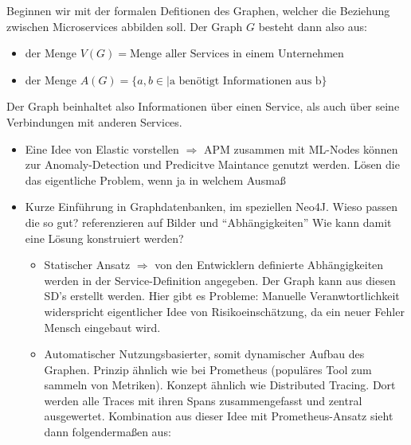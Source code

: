 \documentclass[
	12pt,
	BCOR=5mm,
	DIV=12,
	headinclude=on,
	footinclude=off,
	parskip=half,
	bibliography=totoc,
	listof=entryprefix,
	toc=listof,
	numbers=noenddot,
	plainfootsepline
]{scrreprt}
\begin{document}
\begin{example}
	Beginnen wir mit der formalen Defitionen des Graphen, welcher die Beziehung zwischen Microservices abbilden soll. Der Graph $G$ besteht dann also aus: 
	\begin{itemize}
		\item der Menge $V(G)=\text{Menge aller Services in einem Unternehmen}$
		\item der Menge $A(G)=\{a,b \in \mid \text{a benötigt Informationen aus b}\}$
	\end{itemize}
	Der Graph beinhaltet also Informationen über einen Service, als auch über seine Verbindungen mit anderen Services.
\end{example}


\begin{itemize}
	\item Eine Idee von Elastic vorstellen $\Rightarrow$ APM zusammen mit ML-Nodes können zur Anomaly-Detection und Predicitve Maintance genutzt werden. Lösen die das eigentliche Problem, wenn ja in welchem Ausmaß
	\item Kurze Einführung in Graphdatenbanken, im speziellen Neo4J. Wieso passen die so gut? referenzieren auf Bilder und \enquote{Abhängigkeiten} Wie kann damit eine Lösung konstruiert werden?
	\begin{itemize}
		\item Statischer Ansatz $\Rightarrow$ von den Entwicklern definierte Abhängigkeiten werden in der Service-Definition angegeben. Der Graph kann aus diesen SD's erstellt werden. Hier gibt es Probleme: Manuelle Veranwtortlichkeit widerspricht eigentlicher Idee von Risikoeinschätzung, da ein neuer Fehler Mensch eingebaut wird.
		\item Automatischer Nutzungsbasierter, somit dynamischer Aufbau des Graphen. Prinzip ähnlich wie bei Prometheus (populäres Tool zum sammeln von Metriken). Konzept ähnlich wie Distributed Tracing. Dort werden alle Traces mit ihren Spans zusammengefasst und zentral ausgewertet. Kombination aus dieser Idee mit Prometheus-Ansatz sieht dann folgendermaßen aus:
		

\end{itemize}
\end{itemize}
\end{document}

